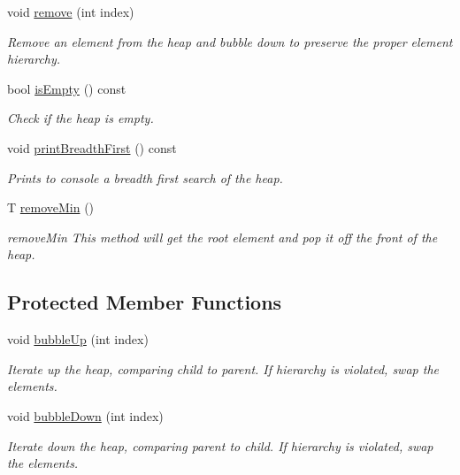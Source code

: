 \begin{DoxyCompactItemize}
void \hyperlink{class_heap_a2cd9562e704cf0f701737b160cf8c8a5}{remove} (int index)
\begin{DoxyCompactList}\small\item\em Remove an element from the heap and bubble down to preserve the proper element hierarchy. \end{DoxyCompactList}\item 
bool \hyperlink{class_heap_a38b1b691f91217b840a9ea210a60f01c}{is\+Empty} () const 
\begin{DoxyCompactList}\small\item\em Check if the heap is empty. \end{DoxyCompactList}\item 
void \hyperlink{class_heap_ab8cd2951cb676ed24532b678b1f89423}{print\+Breadth\+First} () const 
\begin{DoxyCompactList}\small\item\em Prints to console a breadth first search of the heap. \end{DoxyCompactList}\item 
T \hyperlink{class_heap_a1615dd41e58167ffe1c5f8db25862016}{remove\+Min} ()
\begin{DoxyCompactList}\small\item\em remove\+Min This method will get the root element and pop it off the front of the heap. \end{DoxyCompactList}\end{DoxyCompactItemize}
\subsection*{Protected Member Functions}
\begin{DoxyCompactItemize}
\item 
void \hyperlink{class_heap_a31da6bf844fda0faccefc70e87ce590f}{bubble\+Up} (int index)
\begin{DoxyCompactList}\small\item\em Iterate up the heap, comparing child to parent. If hierarchy is violated, swap the elements. \end{DoxyCompactList}\item 
void \hyperlink{class_heap_a85315950c4a25098f7c4d0d6d05b8d64}{bubble\+Down} (int index)
\begin{DoxyCompactList}\small\item\em Iterate down the heap, comparing parent to child. If hierarchy is violated, swap the elements. \end{DoxyCompactList}\end{DoxyCompactItemize}


